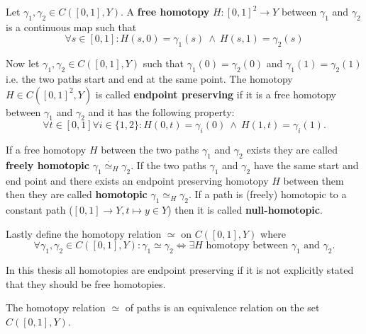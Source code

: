 \begin{defin}
  Let $\gamma_1, \gamma_2 \in C([0, 1], Y)$. A \textbf{free homotopy} $H\colon [0,1]^2 \to Y$ between $\gamma_1$ and $\gamma_2$ is a continuous map such that
  \begin{equation*}
    \forall s \in [0,1]\colon H(s, 0) = \gamma_1(s) \: \land \: H(s, 1) = \gamma_2(s)
  \end{equation*}

  Now let $\gamma_1, \gamma_2 \in C([0, 1], Y)$ such that $\gamma_1(0) = \gamma_2(0)$ and $\gamma_1(1) = \gamma_2(1)$ i.e. the two paths start and end at the same point.
  The homotopy $H \in C([0,1]^2, Y)$ is called \textbf{endpoint preserving} if it is a free homotopy between $\gamma_1$ and $\gamma_2$ and it has the following property:
  \begin{equation*}
    \forall t\in[0,1]\forall i\in \{1,2\}\colon H(0, t) = \gamma_i(0) \: \land \: H(1, t) = \gamma_i(1).
  \end{equation*}

  If a free homotopy $H$ between the two paths $\gamma_1$ and $\gamma_2$ exists they are called \textbf{freely homotopic} $\gamma_1 \overset{\cdot}{\simeq}_H \gamma_2$.
  If the two paths $\gamma_1$ and $\gamma_2$ have the same start and end point and there exists an endpoint preserving homotopy $H$ between them then they are called 
  \textbf{homotopic} $\gamma_1 \simeq_H \gamma_2$. If a path is (freely) homotopic to a constant path ($[0,1] \to Y, t \mapsto y \in Y$) then it is called \textbf{null-homotopic}.

  Lastly define the homotopy relation $\simeq$ on $C([0,1], Y)$ where 
  \begin{equation*}
    \forall\gamma_1, \gamma_2 \in C([0,1], Y)\colon \gamma_1 \simeq \gamma_2 \iff \exists H \text{ homotopy between } \gamma_1 \text{ and } \gamma_2.
  \end{equation*}
\end{defin}

In this thesis all homotopies are endpoint preserving if it is not explicitly stated that they should be free homotopies.

\begin{lemma} \label{lem:homotopy-equivalence}
  The homotopy relation $\simeq$ of paths is an equivalence relation on the set $C([0,1],Y)$.
\end{lemma}

